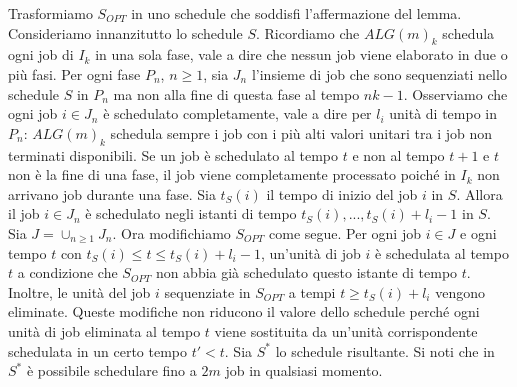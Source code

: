 \documentclass[12pt]{article}
\begin{document}
Trasformiamo $S_{OPT}$ in uno schedule che soddisfi l'affermazione del lemma. Consideriamo innanzitutto lo schedule $S$. Ricordiamo che $ALG(m)_{k}$ schedula ogni job di $I_{k}$ in una sola fase, vale a dire che nessun job viene elaborato in due o più fasi. Per ogni fase $P_{n}$, $n \geq 1$, sia $J_{n}$ l'insieme di job che sono sequenziati nello schedule $S$ in $P_{n}$ ma non alla fine di questa fase al tempo $nk - 1$. Osserviamo che ogni job $i \in J_{n}$ è schedulato completamente, vale a dire per $l_{i}$ unità di tempo in $P_{n}$: $ALG(m)_{k}$ schedula sempre i job con i più alti valori unitari tra i job non terminati disponibili. Se un job è schedulato al tempo $t$ e non al tempo $t + 1$ e $t$ non è la fine di una fase, il job viene completamente processato poiché in $I_{k}$ non arrivano job durante una fase. Sia $t_{S} (i)$ il tempo di inizio del job $i$ in $S$. Allora il job $i \in J_{n}$ è schedulato negli istanti di tempo $t_{S}(i), . . . , t_{S}(i) + l_{i} - 1$ in $S$. Sia $J = \cup_{n \geq 1} J_{n}$. Ora modifichiamo $S_{OPT}$ come segue. Per ogni job $i \in J$ e ogni tempo $t$ con $t_{S}(i) \leq t \leq t_{S} (i) + l_{i} - 1$, un'unità di job $i$ è schedulata al tempo $t$ a condizione che $S_{OPT}$ non abbia già schedulato questo istante di tempo $t$. Inoltre, le unità del job $i $ sequenziate in $S_{OPT}$ a tempi $t \geq t_{S}(i) + l_{i}$ vengono eliminate. Queste modifiche non riducono il valore dello schedule perché ogni unità di job eliminata al tempo $t$ viene sostituita da un'unità corrispondente schedulata in un certo tempo $t' < t$. Sia $S^{*}$ lo schedule risultante. Si noti che in $S^{*}$ è possibile schedulare fino a $2m$ job in qualsiasi momento. 
\end{document}
